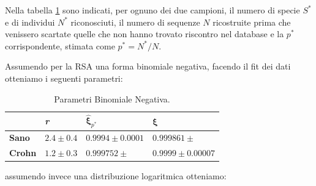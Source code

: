 Nella tabella \ref{Tab:dati} sono indicati, per ognuno dei due campioni, il numero di specie $S^*$ e di individui $N^*$ riconosciuti, il numero di sequenze $N$ ricostruite prima che venissero scartate quelle che non hanno trovato riscontro nel database e la $p^*$ corrispondente, stimata come $p^*=N^*/N$.


Assumendo per la RSA una forma binomiale negativa, facendo il fit dei dati otteniamo i seguenti parametri:


\begin{table}[H]
\centering
\begin{tabular}{l|l|l|l|}
\cline{2-4}
                                     & \textit{r}    & $\mathbf{\hat \xi}_{p^*}$                & $\mathbf{\xi}$             \\ \hline
\multicolumn{1}{|l|}{\textbf{Sano}}  & $2.4 \pm 0.4$ & $0.9994 \pm 0.0001$ & $0.999861 \pm $ \\ \hline
\multicolumn{1}{|l|}{\textbf{Crohn}} & $1.2 \pm 0.3$ & $0.999752 \pm $     & $0.9999 \pm 0.00007$ \\ \hline
\end{tabular}
\caption{Parametri Binomiale Negativa.}
\label{Tab:dati}
\end{table}

assumendo invece una distribuzione logaritmica otteniamo:

